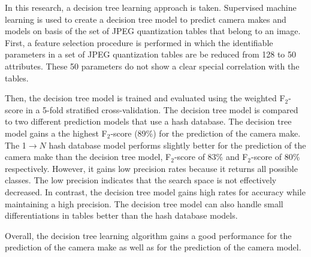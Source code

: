 In this research, a decision tree learning approach is taken. Supervised machine learning is used to create a decision tree model to predict camera makes and models on basis of the set of JPEG quantization tables that belong to an image. First, a feature selection procedure is performed in which the identifiable parameters in a set of JPEG quantization tables are be reduced from 128 to 50 attributes. These 50 parameters do not show a clear special correlation with the tables. 

Then, the decision tree model is trained and evaluated using the weighted F$_2$-score in a 5-fold stratified cross-validation. The decision tree model is compared to two different prediction models that use a hash database. The decision tree model gains a the highest F$_2$-score (89\%) for the prediction of the camera make. The 1$\rightarrow N$ hash database model performs slightly better for the prediction of the camera make than the decision tree model, F$_2$-score of 83\% and F$_2$-score of 80\% respectively. However, it gains low precision rates because it returns all possible classes. The low precision indicates that the search space is not effectively decreased. In contrast, the decision tree model gains high rates for accuracy while maintaining a high precision. The decision tree model can also handle small differentiations in tables better than the hash database models.

Overall, the decision tree learning algorithm gains a good performance for the prediction of the camera make as well as for the prediction of the camera model. 

